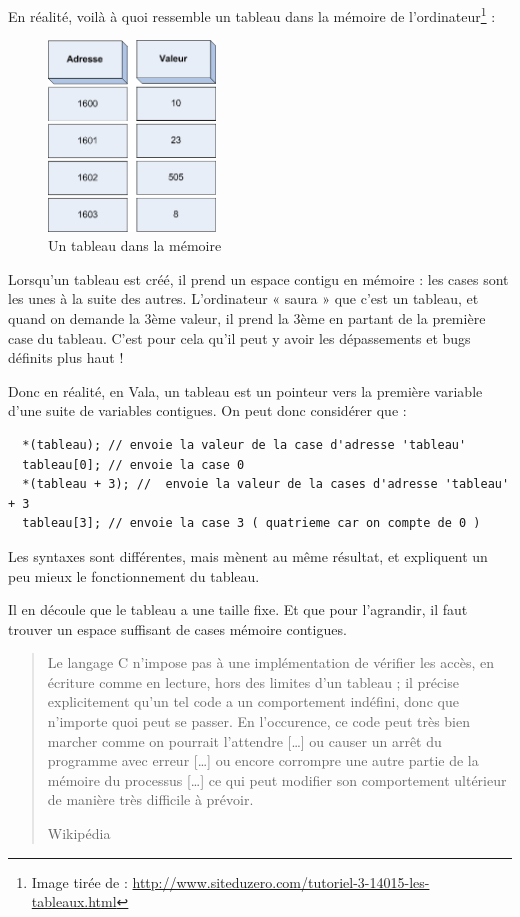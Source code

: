 En réalité, voilà à quoi ressemble un tableau dans la mémoire de l'ordinateur\footnote{Image tirée de : \url{http://www.siteduzero.com/tutoriel-3-14015-les-tableaux.html}} : 
\begin{figure}[H]
	\begin{center}
	  \includegraphics[width=12em]{Annexes/Images/tableau.png}
	\end{center}
	\caption{Un tableau dans la mémoire}
\end{figure}

Lorsqu'un tableau est créé, il prend un espace contigu en mémoire : les cases sont les unes à la suite des autres. L'ordinateur « saura » que c'est un tableau, et quand on demande la 3ème valeur, il prend la 3ème en partant de la première case du tableau. C'est pour cela qu'il peut y avoir les dépassements et bugs définits plus haut !

Donc en réalité, en Vala, un tableau est un pointeur vers la première variable d'une suite de variables contigues. On peut donc considérer que : 
\begin{lstlisting}
  *(tableau); // envoie la valeur de la case d'adresse 'tableau'
  tableau[0]; // envoie la case 0
  *(tableau + 3); //  envoie la valeur de la cases d'adresse 'tableau' + 3
  tableau[3]; // envoie la case 3 ( quatrieme car on compte de 0 )
\end{lstlisting}
Les syntaxes sont différentes, mais mènent au même résultat, et expliquent un peu mieux le fonctionnement du tableau.

Il en découle que le tableau a une taille fixe. Et que pour l'agrandir, il faut trouver un espace suffisant de cases mémoire contigues.

\begin{quotation}
  Le langage C n'impose pas à une implémentation de vérifier les accès, en écriture comme en lecture, hors des limites d'un tableau ; il précise explicitement qu'un tel code a un comportement indéfini, donc que n'importe quoi peut se passer. En l'occurence, ce code peut très bien marcher comme on pourrait l'attendre […] ou causer un arrêt du programme avec erreur […] ou encore corrompre une autre partie de la mémoire du processus […] ce qui peut modifier son comportement ultérieur de manière très difficile à prévoir.
  \begin{flushright}
    Wikipédia
  \end{flushright}
\end{quotation}


